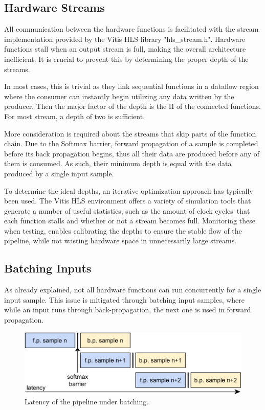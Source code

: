 \subsection{Hardware Streams}
All communication between the hardware functions is facilitated with the stream implementation provided by the Vitis HLS library "hls\_stream.h". Hardware functions stall when an output stream is full, making the overall architecture inefficient. It is crucial to prevent this by determining the proper depth of the streams.

In most cases, this is trivial as they link sequential functions in a dataflow region where the consumer can instantly begin utilizing any data written by the producer. Then the major factor of the depth is the II of the connected functions. For most stream, a depth of two is sufficient.

More consideration is required about the streams that skip parts of the function chain. Due to the Softmax barrier, forward propagation of a sample is completed before its back propagation begins, thus all their data are produced before any of them is consumed. As such, their minimum depth is equal with the data produced by a single input sample.

To determine the ideal depths, an iterative optimization approach has typically been used. The Vitis HLS environment offers a variety of simulation tools that generate a number of useful statistics, such as the amount of clock cycles that each function stalls and whether or not a stream becomes full. Monitoring these when testing, enables calibrating the depths to ensure the stable flow of the pipeline, while not wasting hardware space in unnecessarily large streams.

\subsection{Batching Inputs}
As already explained, not all hardware functions can run concurrently for a single input sample. This issue is mitigated through batching input samples, where while an input runs through back-propagation, the next one is used in forward propagation. %

\begin{figure}[H]
    \centering
        \includegraphics[width=\textwidth]{Images/diagrams/pipeline_under_batching.png}
        \decoRule
        \caption[Pipeline with batching latency]{ Latency of the pipeline under batching.}
        \label{fig: Batching Pipeline latency}
\end{figure}

